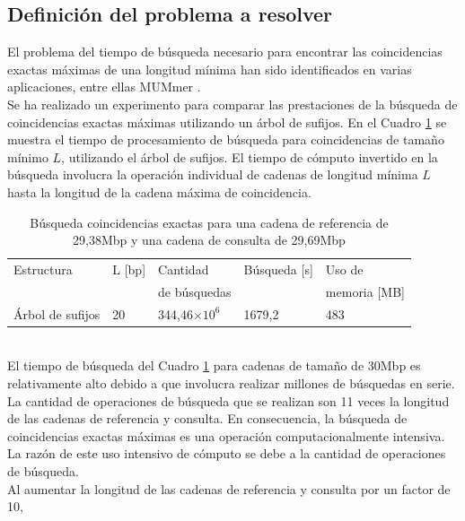 \documentclass[11pt,a4paper,english]{article}
\providecommand{\e}[1]{\ensuremath{\times 10^{#1}}}
\begin{document}
\subsection{Definición del problema a resolver}
El problema del tiempo de búsqueda necesario para encontrar las coincidencias
exactas máximas de una longitud mínima han sido identificados en varias 
aplicaciones, entre ellas MUMmer \cite{Mummer3}.\\
Se ha realizado un experimento para comparar las prestaciones de la búsqueda de
coincidencias exactas máximas utilizando un árbol de sufijos. En el Cuadro 
\ref{tab:buscar} se muestra el tiempo de procesamiento de búsqueda 
para coincidencias de tamaño mínimo $L$, utilizando el árbol de sufijos. El tiempo 
de cómputo invertido en la búsqueda involucra la
operación individual de cadenas de longitud mínima $L$ hasta la longitud de la cadena 
máxima de coincidencia. \\
\begin{table}[ h!] 
  \begin{small}
    \begin{center}
      \begin{tabular}{lllll}
        Estructura & L [bp] & Cantidad  & Búsqueda [s] & Uso de\\
        & & de búsquedas & & memoria [MB] \\
        \hline
        Árbol de sufijos & 20 & 344,46\e{6}  & 1679,2 & 483 \\
        \hline
      \end{tabular}
    \end{center}
  \end{small}
  \caption{Búsqueda coincidencias exactas para una cadena de referencia de 
  29,38Mbp y una cadena de consulta de 29,69Mbp}
  \label{tab:buscar}
\end{table}
\\El tiempo de búsqueda del Cuadro \ref{tab:buscar} para cadenas de tamaño de 30Mbp
es relativamente alto debido a que involucra realizar millones de búsquedas en
serie. La cantidad de operaciones de búsqueda que se realizan son 11 veces la 
longitud de las cadenas de referencia y consulta. En consecuencia, la búsqueda 
de coincidencias exactas máximas es una operación 
computacionalmente intensiva. La razón de este uso intensivo de cómputo se debe a 
la cantidad de operaciones de búsqueda.\\
Al aumentar la longitud de las cadenas de referencia y consulta por un factor de 10, 
\end{document}
